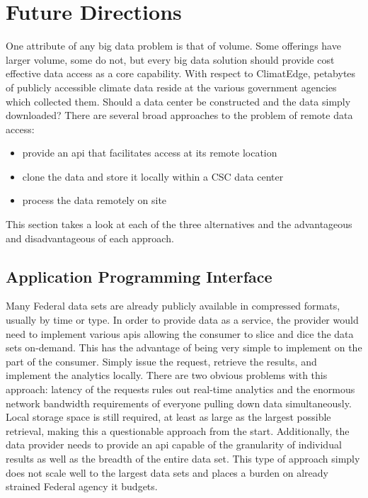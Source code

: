 \section{Future Directions}
One attribute of any big data problem is that of volume. Some offerings have larger volume, some do not, but every big data solution should provide cost effective data access as a core capability. With respect to ClimatEdge, petabytes of publicly accessible climate data reside at the various government agencies which collected them. Should a data center be constructed and the data simply downloaded? There are several broad approaches to the problem of remote data access:
\begin{itemize}
    \item provide an \gls{api} that facilitates access at its remote location
    \item clone the data and store it locally within a \textsc{CSC} data center
    \item process the data remotely on site
\end{itemize}
This section takes a look at each of the three alternatives and the advantageous and disadvantageous of each approach.
\subsection{Application Programming Interface}
Many Federal data sets are already publicly available in compressed formats, usually by time or type. In order to provide data as a service, the provider would need to implement various \gls{api}s allowing the consumer to slice and dice the data sets on-demand. This has the advantage of being very simple to implement on the part of the consumer. Simply issue the request, retrieve the results, and implement the analytics locally. There are two obvious problems with this approach: latency of the requests rules out real-time analytics and the enormous network bandwidth requirements of everyone pulling down data simultaneously. Local storage space is still required, at least as large as the largest possible retrieval, making this a questionable approach from the start. Additionally, the data provider needs to provide an \gls{api} capable of the granularity of individual results as well as the breadth of the entire data set. This type of approach simply does not scale well to the largest data sets and places a burden on already strained Federal agency \gls{it} budgets.
